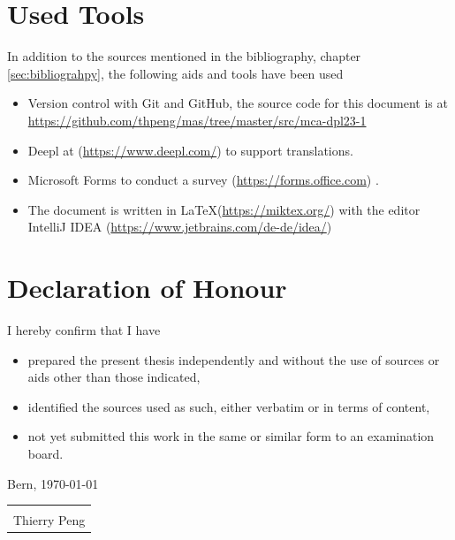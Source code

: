 \documentclass[a4paper,12pt]{article}
\begin{document}
    \section*{Used Tools}
    In addition to the sources mentioned in the bibliography, chapter \ref{sec:bibliograhpy}, the following aids and tools have been used
    \begin{itemize}
        \item Version control with Git and GitHub, the source code for this document is at \url{https://github.com/thpeng/mas/tree/master/src/mca-dpl23-1}
        \item Deepl at (\url{https://www.deepl.com/}) to support translations.
        \item Microsoft Forms to conduct a survey (\url{https://forms.office.com}) .
        \item The document is written in \LaTeX  (\url{https://miktex.org/}) with the editor IntelliJ IDEA (\url{https://www.jetbrains.com/de-de/idea/})
    \end{itemize}

    \section*{Declaration of Honour}

    I hereby confirm that I have
    \begin{itemize}
        \item prepared the present thesis independently and without the use of sources or aids other than those indicated,
        \item identified the sources used as such, either verbatim or in terms of content,
        \item not yet submitted this work in the same or similar form to an examination board.
    \end{itemize}
    Bern, \today\newline
    \newline
    \newline
    \newline
    \begin{tabular}{@{}p{5.0cm}@{}}
        \hrulefill \\
        Thierry Peng
    \end{tabular}

    \pagebreak

\end{document}
